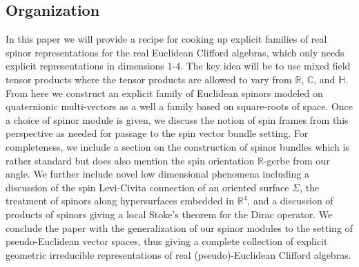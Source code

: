 \documentclass[openany, 11pt]{article}
\theoremstyle{definition}
\theoremstyle{remark}
\def\bC{\ensuremath{\mathbb{C}}}
\def\bH{\ensuremath{\mathbb{H}}}
\def\bR{\ensuremath{\mathbb{R}}}
\begin{document}
\subsection*{Organization}
In this paper we will provide a recipe for cooking up explicit families of real spinor representations for the real Euclidean Clifford algebras, which only needs explicit representations in dimensions $1$-$4$. The key idea will be to use mixed field tensor products where the tensor products are allowed to vary from $\bR$, $\bC$, and $\bH$. From here we construct an explicit family of Euclidean spinors modeled on quaternionic multi-vectors as a well a family based on square-roots of space. Once a choice of spinor module is given, we discuss the notion of spin frames from this perspective as needed for passage to the spin vector bundle setting. For completeness, we include a section on the construction of spinor bundles which is rather standard but does also mention the spin orientation $\bR$-gerbe from our angle. We further include novel low dimensional phenomena including a discussion of the spin Levi-Civita connection of an oriented surface $\Sigma$, the treatment of spinors along hypersurfaces embedded in $\bR^4$, and a discussion of products of spinors giving a local Stoke's theorem for the Dirac operator. We conclude the paper with the generalization of our spinor modules to the setting of pseudo-Euclidean vector spaces, thus giving a complete collection of explicit geometric irreducible representations of real (pseudo)-Euclidean Clifford algebras.
\end{document}
